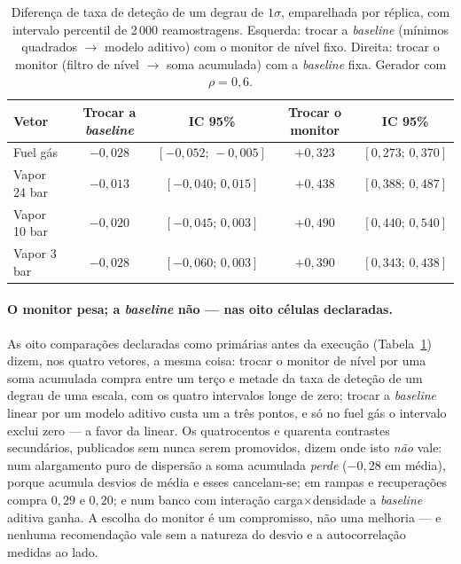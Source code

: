 \begin{table}[htbp]
  \centering
  \caption[Contrastes co-primários com verdade conhecida]{Diferença de taxa
  de deteção de um degrau de $1\sigma$, emparelhada por réplica, com intervalo
  percentil de 2\,000 reamostragens. Esquerda: trocar a \emph{baseline}
  (mínimos quadrados $\to$ modelo aditivo) com o monitor de nível fixo.
  Direita: trocar o monitor (filtro de nível $\to$ soma acumulada) com a
  \emph{baseline} fixa. Gerador com $\rho = 0{,}6$.}
  \label{tab:coprimarias}
  \begin{tabular}{lcccc}
    \toprule
    Vetor & Trocar a \emph{baseline} & IC 95\% & Trocar o monitor & IC 95\% \\
    \midrule
    Fuel gás     & $-0{,}028$ & $[-0{,}052;\,-0{,}005]$ & $+0{,}323$ & $[0{,}273;\,0{,}370]$ \\
    Vapor 24 bar & $-0{,}013$ & $[-0{,}040;\,0{,}015]$  & $+0{,}438$ & $[0{,}388;\,0{,}487]$ \\
    Vapor 10 bar & $-0{,}020$ & $[-0{,}045;\,0{,}003]$  & $+0{,}490$ & $[0{,}440;\,0{,}540]$ \\
    Vapor 3 bar  & $-0{,}028$ & $[-0{,}060;\,0{,}003]$  & $+0{,}390$ & $[0{,}343;\,0{,}438]$ \\
    \bottomrule
  \end{tabular}
\end{table}

\paragraph{O monitor pesa; a \emph{baseline} não --- nas oito células
declaradas.} As oito comparações declaradas como primárias antes da
execução (Tabela~\ref{tab:coprimarias}) dizem, nos quatro vetores, a mesma
coisa: trocar o monitor de nível por uma soma acumulada compra entre um terço
e metade da taxa de deteção de um degrau de uma escala, com os quatro
intervalos longe de zero; trocar a \emph{baseline} linear por um modelo
aditivo custa um a três pontos, e só no fuel gás o intervalo exclui zero ---
a favor da linear. Os quatrocentos e quarenta contrastes secundários,
publicados sem nunca serem promovidos, dizem onde isto \emph{não} vale: num
alargamento puro de dispersão a soma acumulada \emph{perde} ($-0{,}28$ em
média), porque acumula desvios de média e esses cancelam-se; em rampas e
recuperações compra $0{,}29$ e $0{,}20$; e num banco com interação
carga$\times$densidade a \emph{baseline} aditiva ganha. A escolha do monitor
é um compromisso, não uma melhoria --- e nenhuma recomendação vale sem a
natureza do desvio e a autocorrelação medidas ao lado.

